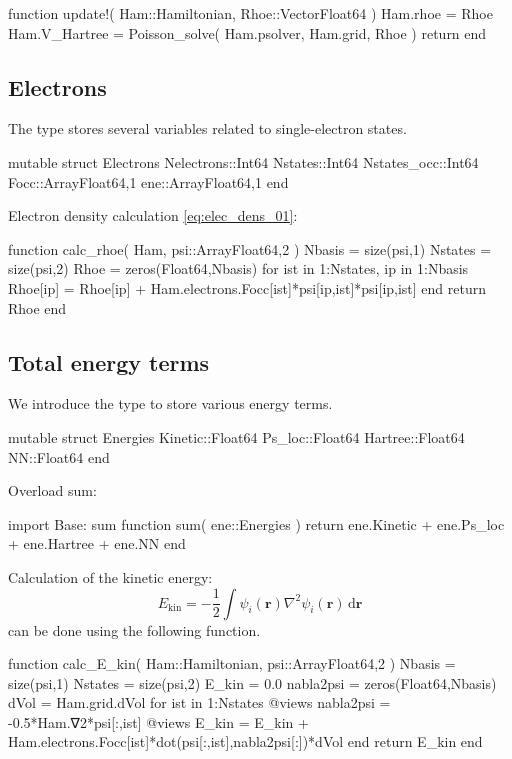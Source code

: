 \begin{juliacode}
function update!( Ham::Hamiltonian, Rhoe::Vector{Float64} )
    Ham.rhoe = Rhoe
    Ham.V_Hartree = Poisson_solve( Ham.psolver, Ham.grid, Rhoe )
    return
end
\end{juliacode}


\subsection{Electrons}

The type  stores several variables related to single-electron states.
\begin{juliacode}
mutable struct Electrons
    Nelectrons::Int64
    Nstates::Int64
    Nstates_occ::Int64
    Focc::Array{Float64,1}
    ene::Array{Float64,1}
end
\end{juliacode}

Electron density calculation \ref{eq:elec_dens_01}:
\begin{juliacode}
function calc_rhoe( Ham, psi::Array{Float64,2} )
    Nbasis = size(psi,1)
    Nstates = size(psi,2)
    Rhoe = zeros(Float64,Nbasis)
    for ist in 1:Nstates, ip in 1:Nbasis
        Rhoe[ip] = Rhoe[ip] +
          Ham.electrons.Focc[ist]*psi[ip,ist]*psi[ip,ist]
    end
    return Rhoe
end
\end{juliacode}


\subsection{Total energy terms}

We introduce the  type to store various energy terms.
\begin{juliacode}
mutable struct Energies
    Kinetic::Float64
    Ps_loc::Float64
    Hartree::Float64
    NN::Float64
end
\end{juliacode}

Overload sum:
\begin{juliacode}
import Base: sum
function sum( ene::Energies )
    return ene.Kinetic + ene.Ps_loc + ene.Hartree + ene.NN
end
\end{juliacode}

Calculation of the kinetic energy:
\begin{equation}
E_{\mathrm{kin}} =
-\frac{1}{2} \int \psi_{i}(\mathbf{r}) \nabla^{2} \psi_{i}(\mathbf{r})\,\mathrm{d}\mathbf{r}
\end{equation}
can be done using the following function.
\begin{juliacode}
function calc_E_kin( Ham::Hamiltonian, psi::Array{Float64,2} )
    Nbasis = size(psi,1)
    Nstates = size(psi,2)
    E_kin = 0.0
    nabla2psi = zeros(Float64,Nbasis)
    dVol = Ham.grid.dVol
    for ist in 1:Nstates
        @views nabla2psi = -0.5*Ham.∇2*psi[:,ist]
        @views E_kin = E_kin + Ham.electrons.Focc[ist]*dot(psi[:,ist],nabla2psi[:])*dVol
    end
    return E_kin
end
\end{juliacode}

